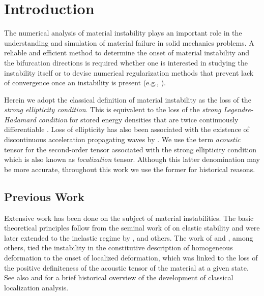 \documentclass[12pt]{article}
\numberwithin{equation}{section}
\begin{document}
\section{Introduction}
\label{sec:intro}

The numerical analysis of material instability plays an important role
in the understanding and simulation of material failure in solid
mechanics problems. A reliable and efficient method to determine the
onset of material instability and the bifurcation directions is
required whether one is interested in studying the instability itself
or to devise numerical regularization methods that prevent lack of
convergence once an instability is present (e.g.,
\cite{Simo.etal:1993, Oliver:1996a, Oliver:1996b,
  Armero.Garikipati:1996, Moes.Belytschko:2002, Foster.etal:2007,
  Chen.etal:2011}).

Herein we adopt the classical definition of material instability as
the loss of the \emph{strong ellipticity condition}. This is
equivalent to the loss of the \emph{strong Legendre-Hadamard
  condition} for stored energy densities that are twice continuously
differentiable \citep{Antman:2005}. Loss of ellipticity has also been
associated with the existence of discontinuous acceleration
propagating waves by \citet{Hill:1962}. We use the term
\emph{acoustic} tensor for the second-order tensor associated with the
strong ellipticity condition which is also known as
\emph{localization} tensor. Although this latter denomination may be
more accurate, throughout this work we use the former for historical
reasons.

\subsection{Previous Work}

Extensive work has been done on the subject of material instabilities.
The basic theoretical principles follow from the seminal work of
\citet{Hadamard:1903} on elastic stability and were later extended to
the inelastic regime by \citet{Thomas:1961}, \citet{Hill:1962} and
others. The work of \citet{Rudnicki.Riche:1975} and \citet{Rice:1976},
among others, tied the instability in the constitutive description of
homogeneous deformation to the onset of localized deformation, which
was linked to the loss of the positive definiteness of the acoustic
tensor of the material at a given state. See also
\citet*{Armero.Garikipati:1996} and \citet*{Miehe.etal:2004} for a
brief historical overview of the development of classical localization
analysis.
\end{document}
